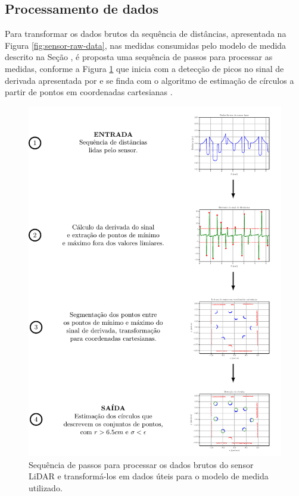 \subsection{Processamento de dados}
\label{sec:lidar-data-processing}
Para transformar os dados brutos da sequência de distâncias, apresentada na Figura 
\ref{fig:sensor-raw-data}, nas medidas consumidas pelo modelo de medida 
descrito na Seção \emph{}, é proposta uma sequência de passos para processar as medidas, conforme a Figura \ref{fig:lidar-data-processing-pipeline} que inicia com a detecção de picos 
no sinal de derivada apresentada por  e se finda com o  
algoritmo de estimação de círculos a partir de pontos em coordenadas 
cartesianas \cite[p.~903]{al2009error}.

\begin{figure}[]
  \includegraphics[width=\textwidth]{figs/data_processing_pipeline.pdf}
  \caption[Sequencia de passos de processamento do dado bruto do sensor LiDAR]{Sequência de passos para processar os dados brutos do sensor LiDAR e
  transformá-los em dados úteis para o modelo de medida utilizado.}
  \label{fig:lidar-data-processing-pipeline}
\end{figure}

